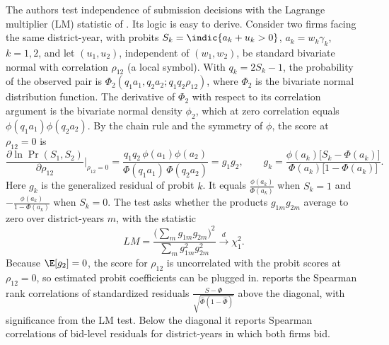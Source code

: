 The authors test independence of submission decisions with the Lagrange multiplier (LM) statistic of \citet{Kiefer1982}.
Its logic is easy to derive. Consider two firms facing the same district-year, with probits $S_k = \indic\{a_k +
u_k > 0\}$, $a_k = w_k\gamma_k$, $k = 1, 2$, and let $(u_1, u_2)$, independent of $(w_1, w_2)$, be standard bivariate normal with correlation
$\rho_{12}$ (a local symbol). With $q_k = 2S_k - 1$, the probability of the observed pair is
$\Phi_2(q_1a_1, q_2a_2; q_1q_2\rho_{12})$, where $\Phi_2$ is the bivariate normal distribution function. The
derivative of $\Phi_2$ with respect to its correlation argument is the bivariate normal density $\phi_2$, which at
zero correlation equals $\phi(q_1a_1)\phi(q_2a_2)$. By the chain rule and the symmetry of $\phi$, the score at
$\rho_{12} = 0$ is
\begin{equation}\label{eq:13-kiefer-score}
  \frac{\partial\ln\Pr(S_1, S_2)}{\partial\rho_{12}}\bigg|_{\rho_{12} = 0}
  = \frac{q_1q_2\,\phi(a_1)\phi(a_2)}{\Phi(q_1a_1)\,\Phi(q_2a_2)} = g_1 g_2,
  \qquad g_k = \frac{\phi(a_k)\bigl[S_k - \Phi(a_k)\bigr]}{\Phi(a_k)\bigl[1 - \Phi(a_k)\bigr]} .
\end{equation}
Here $g_k$ is the generalized residual of probit $k$. It equals $\frac{\phi(a_k)}{\Phi(a_k)}$ when $S_k = 1$ and
$-\frac{\phi(a_k)}{1-\Phi(a_k)}$ when $S_k = 0$. The test asks whether the products $g_{1m}g_{2m}$ average to zero
over district-years $m$, with the statistic
\begin{equation}\label{eq:13-kiefer-lm}
  LM = \frac{\bigl(\sum_m g_{1m}g_{2m}\bigr)^2}{\sum_m g_{1m}^2 g_{2m}^2} \xrightarrow{d} \chi^2_1 .
\end{equation}
Because $\E[g_2] = 0$, the score for $\rho_{12}$ is uncorrelated with the probit scores at $\rho_{12} = 0$, so
estimated probit coefficients can be plugged in.  reports the Spearman rank correlations of
standardized residuals $\frac{S - \hat\Phi}{\sqrt{\hat\Phi(1 - \hat\Phi)}}$ above the diagonal, with significance
from the LM test. Below the diagonal it reports Spearman correlations of bid-level residuals for district-years in
which both firms bid.

